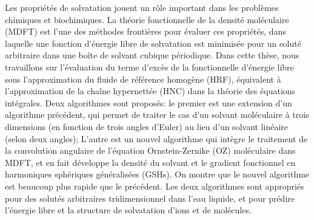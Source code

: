 %
Les propriétés de solvatation jouent un rôle important dans les problèmes
chimiques et biochimiques. La théorie fonctionnelle de la densité
moléculaire (\foreignlanguage{american}{\acs{MDFT}}) est l'une des
méthodes frontières pour évaluer ces propriétés, dans laquelle une
fonction d'énergie libre de solvatation est minimisée pour un soluté
arbitraire dans une boîte de solvant cubique périodique. Dans cette
thèse, nous travaillons sur l'évaluation du terme d'excès de la fonctionnelle
d’énergie libre sous l’approximation du fluide de référence homogène
(\foreignlanguage{american}{\acs{HRF}}), équivalent à l'approximation
de la chaîne hypernettée (\foreignlanguage{american}{\acs{HNC}})
dans la théorie des équations intégrales. Deux algorithmes sont proposés:
le premier est une extension d'un algorithme précédent, qui permet
de traiter le cas d'un solvant moléculaire à trois dimensions (en
fonction de trois angles d'Euler) au lieu d'un solvant linéaire (selon
deux angles); L'autre est un nouvel algorithme qui intègre le traitement
de la convolution angulaire de l'équation Ornstein-Zernike (\foreignlanguage{american}{\acs{OZ}})
moléculaire dans \foreignlanguage{american}{\acs{MDFT}}, et en fait
développe la densité du solvant et le gradient fonctionnel en harmoniques
sphériques généralisées (\foreignlanguage{american}{\acs{GSH}}s).
On montre que le nouvel algorithme est beaucoup plus rapide que le
précédent. Les deux algorithmes sont appropriés pour des solutés arbitraires
tridimensionnel dans l'eau liquide, et pour prédire l'énergie libre
et la structure de solvatation d'ions et de molécules.

%
\vfill{}

\endgroup

